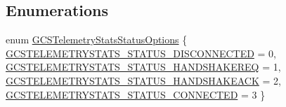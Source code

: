 \subsection*{\-Enumerations}
\begin{DoxyCompactItemize}
\item 
enum \hyperlink{group___g_c_s_telemetry_stats_ga3a3c3f1cbbb636090bdc7c3a750a8479}{\-G\-C\-S\-Telemetry\-Stats\-Status\-Options} \{ \hyperlink{group___g_c_s_telemetry_stats_gga3a3c3f1cbbb636090bdc7c3a750a8479ae243af77f2d6b0a7bef4f6d46674b92c}{\-G\-C\-S\-T\-E\-L\-E\-M\-E\-T\-R\-Y\-S\-T\-A\-T\-S\-\_\-\-S\-T\-A\-T\-U\-S\-\_\-\-D\-I\-S\-C\-O\-N\-N\-E\-C\-T\-E\-D} = 0, 
\hyperlink{group___g_c_s_telemetry_stats_gga3a3c3f1cbbb636090bdc7c3a750a8479a9572d52363fc93daa5ad82590d371e04}{\-G\-C\-S\-T\-E\-L\-E\-M\-E\-T\-R\-Y\-S\-T\-A\-T\-S\-\_\-\-S\-T\-A\-T\-U\-S\-\_\-\-H\-A\-N\-D\-S\-H\-A\-K\-E\-R\-E\-Q} = 1, 
\hyperlink{group___g_c_s_telemetry_stats_gga3a3c3f1cbbb636090bdc7c3a750a8479ae86961567d01b6d8be199b1bb19af32e}{\-G\-C\-S\-T\-E\-L\-E\-M\-E\-T\-R\-Y\-S\-T\-A\-T\-S\-\_\-\-S\-T\-A\-T\-U\-S\-\_\-\-H\-A\-N\-D\-S\-H\-A\-K\-E\-A\-C\-K} = 2, 
\hyperlink{group___g_c_s_telemetry_stats_gga3a3c3f1cbbb636090bdc7c3a750a8479a2a47159ce1fc17966f581d79dd508ab9}{\-G\-C\-S\-T\-E\-L\-E\-M\-E\-T\-R\-Y\-S\-T\-A\-T\-S\-\_\-\-S\-T\-A\-T\-U\-S\-\_\-\-C\-O\-N\-N\-E\-C\-T\-E\-D} = 3
 \}
\end{DoxyCompactItemize}
